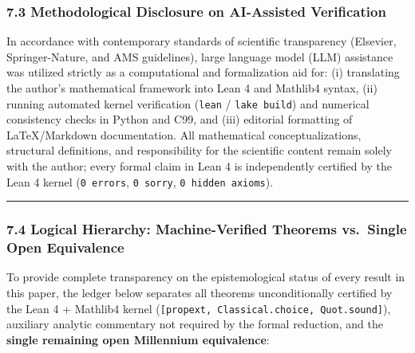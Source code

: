 \documentclass[
  11pt,
]{article}
\begin{document}
\subsubsection{7.3 Methodological Disclosure on AI-Assisted
Verification}\label{methodological-disclosure-on-ai-assisted-verification}

In accordance with contemporary standards of scientific transparency
(Elsevier, Springer-Nature, and AMS guidelines), large language model
(LLM) assistance was utilized strictly as a computational and
formalization aid for: (i) translating the author's mathematical
framework into Lean 4 and Mathlib4 syntax, (ii) running automated kernel
verification (\texttt{lean} / \texttt{lake\ build}) and numerical
consistency checks in Python and C99, and (iii) editorial formatting of
LaTeX/Markdown documentation. All mathematical conceptualizations,
structural definitions, and responsibility for the scientific content
remain solely with the author; every formal claim in Lean 4 is
independently certified by the Lean 4 kernel (\texttt{0\ errors},
\texttt{0\ sorry}, \texttt{0\ hidden\ axioms}).

\begin{center}\rule{0.5\linewidth}{0.5pt}\end{center}

\subsubsection{7.4 Logical Hierarchy: Machine-Verified Theorems
vs.~Single Open
Equivalence}\label{logical-hierarchy-machine-verified-theorems-vs.-single-open-equivalence}

To provide complete transparency on the epistemological status of every
result in this paper, the ledger below separates all theorems
unconditionally certified by the Lean 4 + Mathlib4 kernel
(\texttt{{[}propext,\ Classical.choice,\ Quot.sound{]}}), auxiliary
analytic commentary not required by the formal reduction, and the
\textbf{single remaining open Millennium equivalence}:
\end{document}
